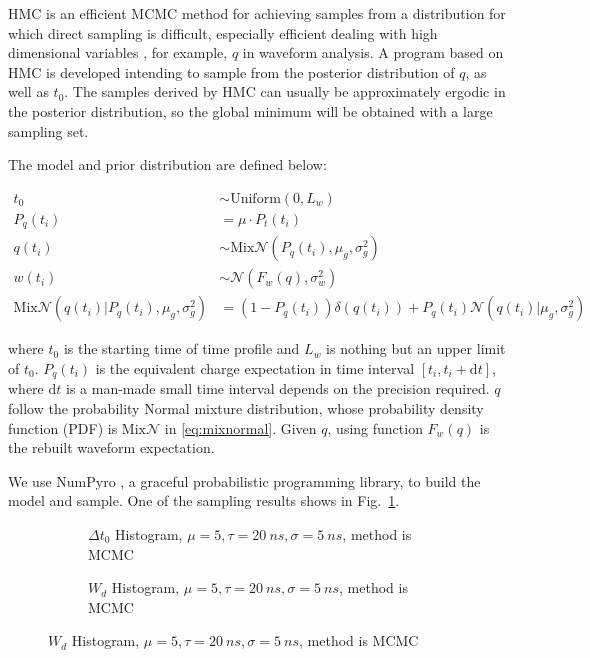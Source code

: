 HMC is an efficient MCMC method for achieving samples from a distribution for which direct sampling is difficult, especially efficient dealing with high dimensional variables \cite{neal_mcmc_2012}, for example, $q$ in waveform analysis. A program based on HMC is developed intending to sample from the posterior distribution of $q$, as well as $t_{0}$. The samples derived by HMC can usually be approximately ergodic in the posterior distribution, so the global minimum will be obtained with a large sampling set. 

The model and prior distribution are defined below: 

\begin{align}
    t_{0} &\sim \mathrm{Uniform}(0, L_{w}) \\
    P_{q}(t_{i}) &= \mu \cdot P_{t}(t_{i}) \\
    q(t_{i}) &\sim \mathrm{Mix}\mathcal{N}(P_{q}(t_{i}), \mu_{g}, \sigma_{g}^{2}) \\
    w(t_{i}) &\sim \mathcal{N}(F_{w}(q), \sigma_{w}^{2}) \\
    \mathrm{Mix}\mathcal{N}(q(t_{i}) | P_{q}(t_{i}), \mu_{g}, \sigma_{g}^{2}) &= (1 - P_{q}(t_{i}))\delta(q(t_{i})) + P_{q}(t_{i})\mathcal{N}(q(t_{i}) | \mu_{g}, \sigma_{g}^{2}) \label{eq:mixnormal}
\end{align}

where $t_{0}$ is the starting time of time profile and $L_{w}$ is nothing but an upper limit of $t_{0}$. $P_{q}(t_{i})$ is the equivalent charge expectation in time interval $[t_{i}, t_{i}+\mathrm{d}t]$, where $\mathrm{d}t$ is a man-made small time interval depends on the precision required. $q$ follow the probability Normal mixture distribution, whose probability density function (PDF) is $\mathrm{Mix}\mathcal{N}$ in \eqref{eq:mixnormal}. Given $q$, using function $F_{w}(q)$ is the rebuilt waveform expectation. 

We use NumPyro \cite{phan2019composable}, a graceful probabilistic programming library, to build the model and sample. One of the sampling results shows in Fig.~\ref{fig:mcmcrec-t0hist}. 

\begin{figure}[H]
\begin{minipage}[t]{.5\textwidth}
\begin{figure}[H]
    \centering
    \resizebox{\textwidth}{!}{}
    \caption{\label{fig:mcmcrec-t0hist} $\Delta t_{0}$ Histogram, $\mu=5, \tau=\SI{20}{ns}, \sigma=\SI{5}{ns}$, method is MCMC}
\end{figure}
\end{minipage}
\begin{minipage}[t]{.5\textwidth}
\begin{figure}[H]
    \centering
    \resizebox{\textwidth}{!}{}
    \caption{\label{fig:mcmcrec-chargehist} $W_{d}$ Histogram, $\mu=5, \tau=\SI{20}{ns}, \sigma=\SI{5}{ns}$, method is MCMC}
\end{figure}
\end{minipage}
\end{figure}


